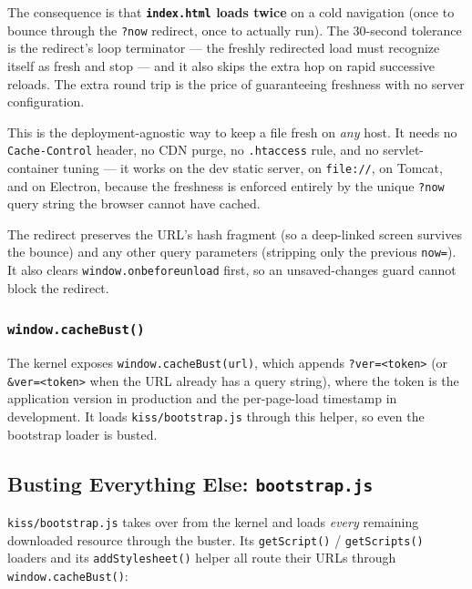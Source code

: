The consequence is that \textbf{\texttt{index.html} loads twice} on a cold navigation (once to bounce through the \texttt{?now} redirect, once to actually run).  The 30-second tolerance is the redirect's loop terminator --- the freshly redirected load must recognize itself as fresh and stop --- and it also skips the extra hop on rapid successive reloads.  The extra round trip is the price of guaranteeing freshness with no server configuration.

\begin{notebox}
This is the deployment-agnostic way to keep a file fresh on \emph{any} host.  It needs no \texttt{Cache-Control} header, no CDN purge, no \texttt{.htaccess} rule, and no servlet-container tuning --- it works on the dev static server, on \texttt{file://}, on Tomcat, and on Electron, because the freshness is enforced entirely by the unique \texttt{?now} query string the browser cannot have cached.
\end{notebox}

\noindent
The redirect preserves the URL's hash fragment (so a deep-linked screen survives the bounce) and any other query parameters (stripping only the previous \texttt{now=}).  It also clears \texttt{window.onbeforeunload} first, so an unsaved-changes guard cannot block the redirect.

\subsubsection*{\texttt{window.cacheBust()}}

The kernel exposes \texttt{window.cacheBust(url)}, which appends \texttt{?ver=<token>} (or \texttt{\&ver=<token>} when the URL already has a query string), where the token is the application version in production and the per-page-load timestamp in development.  It loads \texttt{kiss/bootstrap.js} through this helper, so even the bootstrap loader is busted.

\subsection{Busting Everything Else: \texttt{bootstrap.js}}
\label{sec:cache-bootstrap}

\texttt{kiss/bootstrap.js} takes over from the kernel and loads \emph{every} remaining downloaded resource through the buster.  Its \texttt{getScript()} / \texttt{getScripts()} loaders and its \texttt{addStylesheet()} helper all route their URLs through \texttt{window.cacheBust()}:


